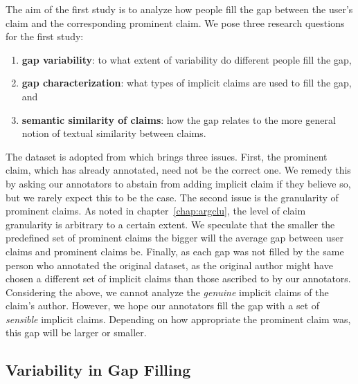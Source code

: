 The aim of the first study is to analyze how people fill 
the gap between the user's claim and the corresponding prominent claim. 
We pose three research questions for the first study: 
\begin{enumerate}[label=\arabic*)]
\item \textbf{gap variability}: to what extent of variability do different people fill the gap,
\item \textbf{gap characterization}: what types of implicit claims are used to fill the gap, and
\item \textbf{semantic similarity of claims}: how the gap relates to the more general notion of 
textual similarity between claims. 
\end{enumerate}
The dataset is adopted from \citet{hasan2014you} which brings three issues. 
First, the prominent claim, which has already annotated, need not be
the correct one. 
We remedy this by asking our annotators to abstain from adding implicit claim if 
they believe so, but we rarely expect this to be the case. 
The second issue is the granularity of prominent claims. 
As noted in chapter~\ref{chap:argclu}, the level of claim granularity is 
arbitrary to a certain extent. 
We speculate that the smaller the predefined set of prominent claims the 
bigger will the average gap between user claims and prominent claims be. 
Finally, as each gap was not filled by the same person who annotated the original 
dataset, as the original author might have chosen a different set of implicit claims than those
ascribed to by our annotators. 
Considering the above, we cannot analyze the \emph{genuine} implicit claims
of the claim's author. 
However, we hope our annotators fill the gap with a set of \emph{sensible} implicit 
claims. 
Depending on how appropriate the prominent claim was, this gap will be larger or smaller. 

\subsection{Variability in Gap Filling} 

